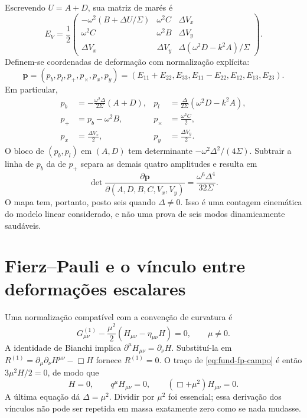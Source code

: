 Escrevendo \(U=A+D\), sua matriz de marés é
\begin{equation}
 E_V=\frac12\begin{pmatrix}
 -\omega^2(B+\Delta U/\Sigma)&\omega^2C&\Delta V_x\\
 \omega^2C&\omega^2B&\Delta V_y\\
 \Delta V_x&\Delta V_y&\Delta(\omega^2D-k^2A)/\Sigma
 \end{pmatrix}.
 \label{eq:fund-eletrica-visser}
\end{equation}
Definem-se coordenadas de deformação com normalização explícita:
\begin{equation}
 \mathbf p=(p_b,p_l,p_+,p_\times,p_x,p_y)
 =(E_{11}+E_{22},E_{33},E_{11}-E_{22},E_{12},E_{13},E_{23}).
 \label{eq:fund-coordenadas-mares}
\end{equation}
Em particular,
\begin{equation}
 \begin{aligned}
 p_b&=-\frac{\omega^2\Delta}{2\Sigma}(A+D),
 &p_l&=\frac{\Delta}{2\Sigma}(\omega^2D-k^2A),\\
 p_+&=p_b-\omega^2B,
 &p_\times&=\frac{\omega^2C}{2},\\
 p_x&=\frac{\Delta V_x}{2},
 &p_y&=\frac{\Delta V_y}{2}.
 \end{aligned}
 \label{eq:fund-coordenadas-visser}
\end{equation}
O bloco de \((p_b,p_l)\) em \((A,D)\) tem determinante
\(-\omega^2\Delta^2/(4\Sigma)\). Subtrair a linha de \(p_b\) da
de \(p_+\) separa as demais quatro amplitudes e resulta em
\begin{equation}
 \det\frac{\partial\mathbf p}{\partial(A,D,B,C,V_x,V_y)}
       =\frac{\omega^6\Delta^4}{32\Sigma}.
 \label{eq:fund-posto-visser}
\end{equation}
O mapa tem, portanto, posto seis quando \(\Delta\ne0\). Isso é
uma contagem cinemática do modelo linear considerado, e não uma prova
de seis modos dinamicamente saudáveis.

\section{Fierz--Pauli e o vínculo entre deformações escalares}

Uma normalização compatível com a convenção de curvatura é
\begin{equation}
 G_{\mu\nu}^{(1)}
    -\frac{\mu^2}{2}(H_{\mu\nu}-\eta_{\mu\nu}H)=0,
 \qquad \mu\ne0.
 \label{eq:fund-fp-campo}
\end{equation}
A identidade de Bianchi implica
\(\partial^\mu H_{\mu\nu}=\partial_\nu H\). Substituí-la em
\(R^{(1)}=\partial_\mu\partial_\nu H^{\mu\nu}-\Box H\)
fornece \(R^{(1)}=0\). O traço de
\eqref{eq:fund-fp-campo} é então \(3\mu^2H/2=0\), de modo que
\begin{equation}
 H=0,\qquad q^\mu H_{\mu\nu}=0,
 \qquad (\Box+\mu^2)H_{\mu\nu}=0.
 \label{eq:fund-fp-vinculos}
\end{equation}
A última equação dá \(\Delta=\mu^2\). Dividir por \(\mu^2\)
foi essencial; essa derivação dos vínculos não pode ser repetida em
massa exatamente zero como se nada mudasse.

